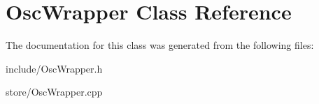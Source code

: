 \hypertarget{classOscWrapper}{}\section{Osc\+Wrapper Class Reference}
\label{classOscWrapper}


The documentation for this class was generated from the following files\+:\begin{DoxyCompactItemize}
\item 
include/Osc\+Wrapper.\+h\item 
store/Osc\+Wrapper.\+cpp\end{DoxyCompactItemize}
